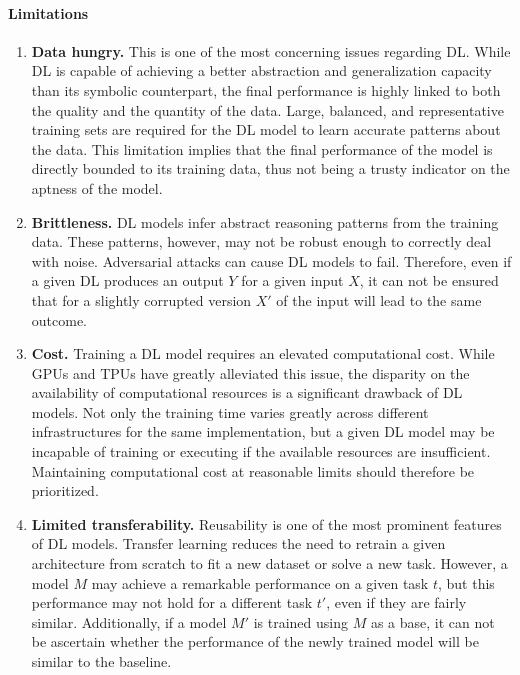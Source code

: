 \paragraph{Limitations}
\begin{enumerate} [start=1,label={\bfseries L\arabic*.}]
    \item \label{kbsintrodl_L_data_hungry} \textbf{Data hungry.} This is one of the most concerning issues regarding DL. While DL is capable of achieving a better abstraction and generalization capacity than its symbolic counterpart, the final performance is highly linked to both the quality and the quantity of the data. Large, balanced, and representative training sets are required for the DL model to learn accurate patterns about the data. This limitation implies that the final performance of the model is directly bounded to its training data, thus not being a trusty indicator on the aptness of the model. 
    
    \item \label{kbsintrodl_L_brittleness} \textbf{Brittleness.} DL models infer abstract reasoning patterns from the training data. These patterns, however, may not be robust enough to correctly deal with noise. Adversarial attacks can cause DL models to fail. Therefore, even if a given DL produces an output $Y$ for a given input $X$, it can not be ensured that for a slightly corrupted version $X'$ of the input will lead to the same outcome.
    
    \item \label{kbsintrodl_L_cost} \textbf{Cost.} Training a DL model requires an elevated computational cost. While GPUs and TPUs have greatly alleviated this issue, the disparity on the availability of computational resources is a significant drawback of DL models. Not only the training time varies greatly across different infrastructures for the same implementation, but a given DL model may be incapable of training or executing if the available resources are insufficient. Maintaining computational cost at reasonable limits should therefore be prioritized.  
    
    \item \label{kbsintrodl_L_transfer} \textbf{Limited transferability.} Reusability is one of the most prominent features of DL models. Transfer learning reduces the need to retrain a given architecture from scratch to fit a new dataset or solve a new task. However, a model $M$ may achieve a remarkable performance on a given task $t$, but this performance may not  hold for a different task $t'$, even if they are fairly similar. Additionally, if a model $M'$ is trained using $M$ as a base, it can not be ascertain whether the performance of the newly trained model will be similar to the baseline.
    

\end{enumerate}
